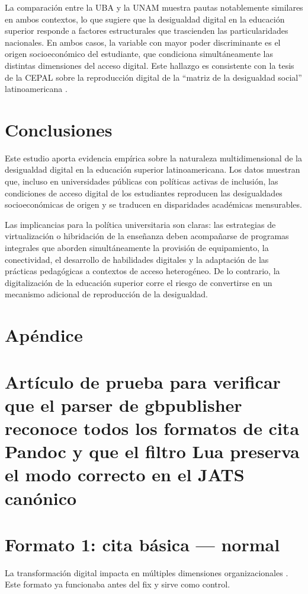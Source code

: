 La comparación entre la UBA y la UNAM muestra pautas notablemente similares en ambos contextos, lo que sugiere que la desigualdad digital en la educación superior responde a factores estructurales que trascienden las particularidades nacionales. En ambos casos, la variable con mayor poder discriminante es el origen socioeconómico del estudiante, que condiciona simultáneamente las distintas dimensiones del acceso digital. Este hallazgo es consistente con la tesis de la CEPAL sobre la reproducción digital de la “matriz de la desigualdad social” latinoamericana \autocite{2566-CEPAL2021}.


\section{Conclusiones}
Este estudio aporta evidencia empírica sobre la naturaleza multidimensional de la desigualdad digital en la educación superior latinoamericana. Los datos muestran que, incluso en universidades públicas con políticas activas de inclusión, las condiciones de acceso digital de los estudiantes reproducen las desigualdades socioeconómicas de origen y se traducen en disparidades académicas mensurables.

Las implicancias para la política universitaria son claras: las estrategias de virtualización o hibridación de la enseñanza deben acompañarse de programas integrales que aborden simultáneamente la provisión de equipamiento, la conectividad, el desarrollo de habilidades digitales y la adaptación de las prácticas pedagógicas a contextos de acceso heterogéneo. De lo contrario, la digitalización de la educación superior corre el riesgo de convertirse en un mecanismo adicional de reproducción de la desigualdad.


\section{Apéndice}

\section{Artículo de prueba para verificar que el parser de gbpublisher reconoce todos los formatos de cita Pandoc y que el filtro Lua preserva el modo correcto en el JATS canónico}

\section{Formato 1: cita básica — normal}
La transformación digital impacta en múltiples dimensiones organizacionales \autocite{2564-VANDEURSEN2019}. Este formato ya funcionaba antes del fix y sirve como control.


